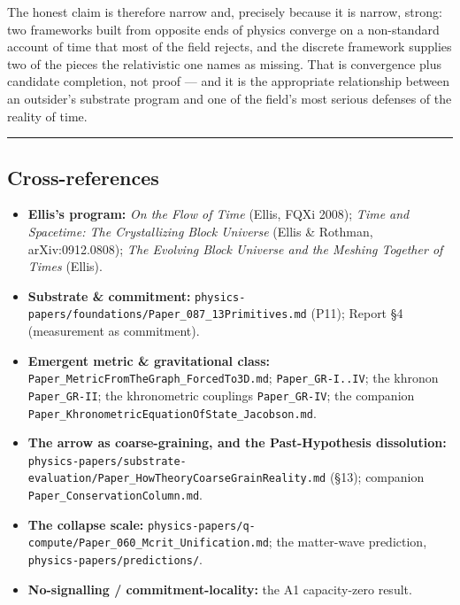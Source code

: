 \documentclass[
  11pt,
]{article}
\providecommand{\tightlist}{%
  \setlength{\itemsep}{0pt}\setlength{\parskip}{0pt}}
\providecommand{\tightlist}{}
\begin{document}
The honest claim is therefore narrow and, precisely because it is
narrow, strong: two frameworks built from opposite ends of physics
converge on a non-standard account of time that most of the field
rejects, and the discrete framework supplies two of the pieces the
relativistic one names as missing. That is convergence plus candidate
completion, not proof --- and it is the appropriate relationship between
an outsider's substrate program and one of the field's most serious
defenses of the reality of time.

\begin{center}\rule{0.5\linewidth}{0.5pt}\end{center}

\subsection{Cross-references}\label{cross-references}

\begin{itemize}
\tightlist
\item
  \textbf{Ellis's program:} \emph{On the Flow of Time} (Ellis, FQXi
  2008); \emph{Time and Spacetime: The Crystallizing Block Universe}
  (Ellis \& Rothman, arXiv:0912.0808); \emph{The Evolving Block Universe
  and the Meshing Together of Times} (Ellis).
\item
  \textbf{Substrate \& commitment:}
  \texttt{physics-papers/foundations/Paper\_087\_13Primitives.md} (P11);
  Report §4 (measurement as commitment).
\item
  \textbf{Emergent metric \& gravitational class:}
  \texttt{Paper\_MetricFromTheGraph\_ForcedTo3D.md};
  \texttt{Paper\_GR-I..IV}; the khronon \texttt{Paper\_GR-II}; the
  khronometric couplings \texttt{Paper\_GR-IV}; the companion
  \texttt{Paper\_KhronometricEquationOfState\_Jacobson.md}.
\item
  \textbf{The arrow as coarse-graining, and the Past-Hypothesis
  dissolution:}
  \texttt{physics-papers/substrate-evaluation/Paper\_HowTheoryCoarseGrainReality.md}
  (§13); companion \texttt{Paper\_ConservationColumn.md}.
\item
  \textbf{The collapse scale:}
  \texttt{physics-papers/q-compute/Paper\_060\_Mcrit\_Unification.md};
  the matter-wave prediction, \texttt{physics-papers/predictions/}.
\item
  \textbf{No-signalling / commitment-locality:} the A1 capacity-zero
  result.
\end{itemize}
\end{document}
